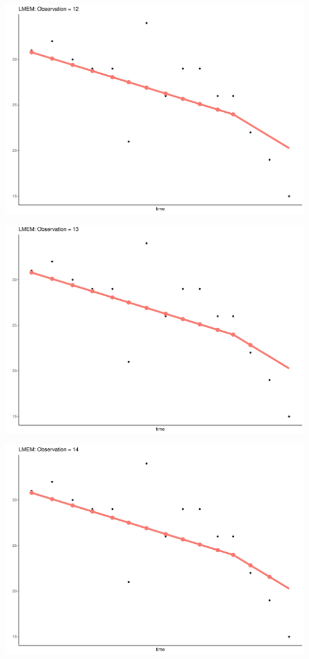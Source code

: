 \documentclass[
  ignorenonframetext,
]{beamer}
\begin{document}
\begin{frame}{}
\protect\hypertarget{section-11}{}
\includegraphics{Prez4_files/figure-beamer/unnamed-chunk-13-12.pdf}
\end{frame}

\begin{frame}{}
\protect\hypertarget{section-12}{}
\includegraphics{Prez4_files/figure-beamer/unnamed-chunk-13-13.pdf}
\end{frame}

\begin{frame}{}
\protect\hypertarget{section-13}{}
\includegraphics{Prez4_files/figure-beamer/unnamed-chunk-13-14.pdf}
\end{frame}
\end{document}
